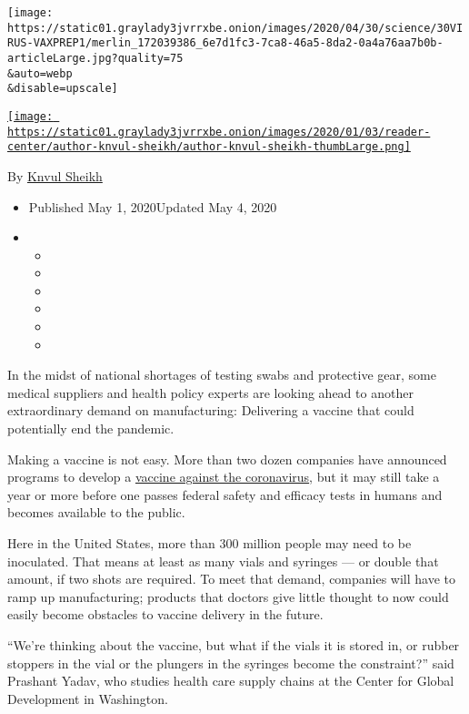 \texttt{[image: https://static01.graylady3jvrrxbe.onion/images/2020/04/30/science/30VIRUS-VAXPREP1/merlin\_172039386\_6e7d1fc3-7ca8-46a5-8da2-0a4a76aa7b0b-articleLarge.jpg?quality=75\\\&auto=webp\\\&disable=upscale]}

\href{https://www.nytimes3xbfgragh.onion/by/knvul-sheikh}{\texttt{[image: https://static01.graylady3jvrrxbe.onion/images/2020/01/03/reader-center/author-knvul-sheikh/author-knvul-sheikh-thumbLarge.png]}}

By \href{https://www.nytimes3xbfgragh.onion/by/knvul-sheikh}{Knvul
Sheikh}

\begin{itemize}
\item
  Published May 1, 2020Updated May 4, 2020
\item
  \begin{itemize}
  \item
  \item
  \item
  \item
  \item
  \item
  \end{itemize}
\end{itemize}

In the midst of national shortages of testing swabs and protective gear,
some medical suppliers and health policy experts are looking ahead to
another extraordinary demand on manufacturing: Delivering a vaccine that
could potentially end the pandemic.

Making a vaccine is not easy. More than two dozen companies have
announced programs to develop a
\href{https://www.nytimes3xbfgragh.onion/2020/01/28/health/coronavirus-vaccine.html}{vaccine
against the coronavirus}, but it may still take a year or more before
one passes federal safety and efficacy tests in humans and becomes
available to the public.

Here in the United States, more than 300 million people may need to be
inoculated. That means at least as many vials and syringes --- or double
that amount, if two shots are required. To meet that demand, companies
will have to ramp up manufacturing; products that doctors give little
thought to now could easily become obstacles to vaccine delivery in the
future.

``We're thinking about the vaccine, but what if the vials it is stored
in, or rubber stoppers in the vial or the plungers in the syringes
become the constraint?'' said Prashant Yadav, who studies health care
supply chains at the Center for Global Development in Washington.

